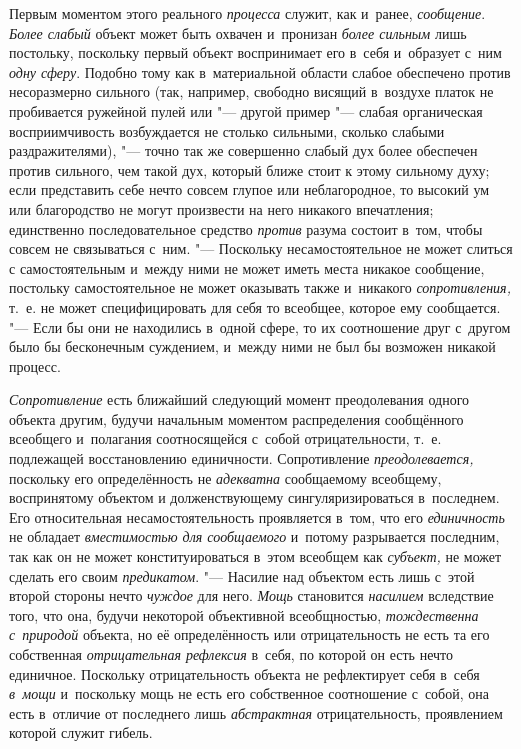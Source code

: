 Первым моментом этого реального
{\em процесса} служит,
как и~ранее, {\em сообщение}.
{\em Более слабый} объект
может быть охвачен и~пронизан {\em более
сильным} лишь постольку, поскольку первый объект
воспринимает его в~себя и~образует с~ним
{\em одну сферу}. Подобно
тому как в~материальной области слабое обеспечено против несоразмерно
сильного (так, например, свободно висящий в~воздухе платок не пробивается
ружейной пулей или "--- другой пример "--- слабая
органическая восприимчивость возбуждается не столько сильными, сколько
слабыми раздражителями), "--- точно так же совершенно слабый
дух более обеспечен против сильного, чем такой дух, который ближе стоит к
этому сильному духу; если представить себе нечто совсем глупое или
неблагородное, то высокий ум или благородство не могут произвести на него
никакого впечатления; единственно последовательное средство
{\em против} разума
состоит в~том, чтобы совсем не связываться с~ним. "---
Поскольку несамостоятельное не может слиться с
самостоятельным и~между ними не может иметь места никакое сообщение,
постольку самостоятельное не может оказывать также и~никакого
{\em сопротивления,}
т.~е. не может специфицировать для себя то всеобщее, которое
ему сообщается. "--- Если бы они не находились в~одной сфере,
то их соотношение друг с~другом было бы бесконечным
суждением, и~между ними не был бы возможен никакой процесс.

{\em Сопротивление} есть
ближайший следующий момент преодолевания одного объекта другим, будучи
начальным моментом распределения сообщённого всеобщего и~полагания
соотносящейся с~собой отрицательности, т.~е. подлежащей восстановлению
единичности. Сопротивление
{\em преодолевается,}
поскольку его определённость не
{\em адекватна}
сообщаемому всеобщему, воспринятому объектом и
долженствующему сингуляризироваться в~последнем. Его относительная
несамостоятельность проявляется в~том, что его
{\em единичность} не
обладает {\em вместимостью для
сообщаемого} и~потому разрывается последним, так как он не
может конституироваться в~этом всеобщем как
{\em субъект,} не может
сделать его своим {\em предикатом}. "---
Насилие над объектом есть лишь с~этой второй стороны нечто
{\em чуждое} для него.
{\em Мощь} становится
{\em насилием} вследствие
того, что она, будучи некоторой объективной всеобщностью,
{\em тождественна с~природой}
объекта, но её определённость или отрицательность не есть та
его собственная {\em отрицательная
рефлексия} в~себя, по которой он есть нечто единичное.
Поскольку отрицательность объекта не рефлектирует себя в~себя
{\em в~мощи} и~поскольку
мощь не есть его собственное соотношение с~собой, она есть в~отличие от
последнего лишь {\em абстрактная}
отрицательность, проявлением которой служит гибель.

